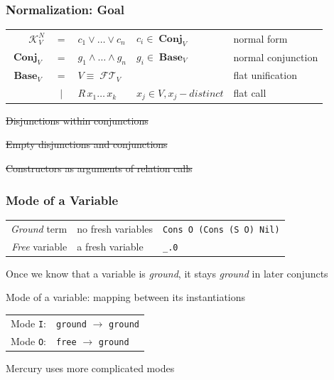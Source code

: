 \documentclass[xcolor=table, aspectratio=169]{beamer}
\newcommand{\makenote}[1]{\hfill \footnotesize{#1}}
\newcommand{\strikeoutnote}[1]{\makenote{\strikethrough{#1}}}
\newcommand{\strikethrough}[1]{\sout{#1}}
\DeclareMathOperator{\FlatTerm}{\mathcal{FT}}
\DeclareMathOperator{\Base}{\mathbf{Base}}
\DeclareMathOperator{\Conj}{\mathbf{Conj}}
\newcommand{\KanN}{\mathcal{K}^{N}}
\begin{document}
\begin{frame}[fragile]
  \frametitle{Normalization: Goal}
\begin{center}
\begin{tabular}{rclll}
$\KanN_{V}$ & $=$ & $c_1 \vee \ldots \vee c_{n}$ & $c_{i}\in \Conj_{V}$ & normal form \\
$\Conj_{V}$ & $=$ & $g_1 \wedge \ldots \wedge g_n$ & $ g_{i}\in \Base_{V}$ & normal conjunction \\
$\Base_{V}$ & $=$ & $V \equiv \FlatTerm_{V}$ & & flat unification \\
            & $\mid$ & $R \, x_1 \ldots \, x_{k} $ & $ x_{j}\in V, x_j - distinct$ & flat call \\
\end{tabular}
\end{center}


\vfill

\strikeoutnote{Disjunctions within conjunctions}

\strikeoutnote{Empty disjunctions and conjunctions}

\strikeoutnote{Constructors as arguments of relation calls}

\end{frame}


\begin{frame}[fragile]
  \frametitle{Mode of a Variable}
\begin{center}
\begin{tabular}{rll}
  \emph{Ground} term & no fresh variables & \lstinline|Cons O (Cons (S O) Nil)| \\
  \emph{Free} variable & a fresh variable & \lstinline|_.0|
\end{tabular}

\vfill

Once we know that a variable is \emph{ground}, it stays \emph{ground} in later conjuncts
\end{center}

\vfill

\begin{center}
Mode of a variable: mapping between its instantiations

\vfill

\begin{tabular}{rl}
  Mode \lstinline|I|: & \lstinline|ground| $\rightarrow$ \lstinline|ground| \\
  Mode \lstinline|O|: & \lstinline|free| $\rightarrow$ \lstinline|ground|
\end{tabular}
\end{center}

\vfill

\hfill \footnotesize Mercury uses more complicated modes

\end{frame}
\end{document}
